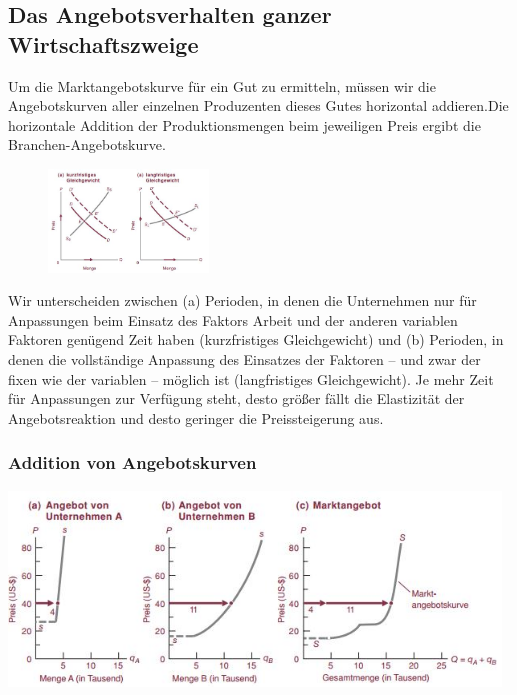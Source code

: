 \documentclass[10pt]{scrartcl}
\begin{document}
\subsection{Das Angebotsverhalten ganzer Wirtschaftszweige}
Um die Marktangebotskurve für ein Gut zu ermitteln, müssen wir die Angebotskurven aller einzelnen Produzenten dieses Gutes horizontal addieren.Die horizontale Addition der Produktionsmengen beim jeweiligen Preis ergibt die Branchen-Angebotskurve.

\begin{figure}
  \begin{center}
  	\vspace{-20pt}
    \includegraphics[width=0.38\textwidth]{img/marshall.jpg}
    \vspace{-20pt}
    \end{center}
\end{figure}
Wir unterscheiden zwischen (a) Perioden, in denen die Unternehmen nur für Anpassungen beim Einsatz des Faktors Arbeit und der anderen variablen Faktoren genügend Zeit haben (kurzfristiges Gleichgewicht) und (b) Perioden, in denen die vollständige Anpassung des Einsatzes der Faktoren – und zwar der fixen wie der variablen – möglich ist (langfristiges Gleichgewicht). Je mehr Zeit für Anpassungen zur Verfügung steht, desto  größer fällt die Elastizität der Angebotsreaktion und desto geringer die Preissteigerung aus. 

\subsubsection{Addition von Angebotskurven}
\includegraphics[width=0.98\textwidth]{img/addition.jpg}
\end{document}
